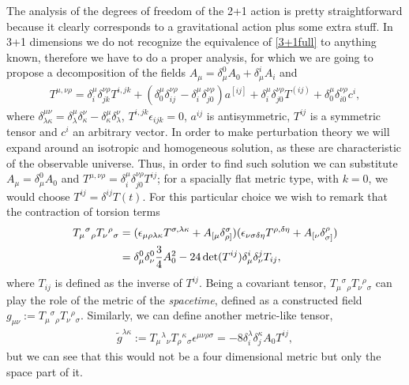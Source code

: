 \documentclass[%
  showpacs,showkeys,prd,superscriptaddress]{revtex4-1}
\begin{document}
The  analysis of the degrees of freedom of the 2+1 action is pretty straightforward because it clearly corresponds to a gravitational action plus some extra stuff. In 3+1 dimensions we do not recognize the equivalence of \eqref{3+1full} to anything known, therefore we have to do a proper analysis, for which we are going to propose a decomposition of the fields $A_\mu=\delta_\mu^0 A_0+\delta_\mu^iA_i$ and 
\begin{align}
  T^{\mu,\nu\rho}=\delta^{\mu}_i\delta^{\nu\rho}_{jk}T^{i,jk}+(\delta^{\mu}_0\delta^{\nu\rho}_{ij}-\delta^{\mu}_i\delta^{\nu\rho}_{j0})a^{[ij]}+\delta^{\mu}_i\delta^{\nu\rho}_{j0}T^{(ij)}+\delta^{\mu}_0\delta^{\nu\rho}_{i0}c^i,
\end{align}
where $\delta^{\mu\nu}_{\lambda\kappa}=\delta^{\mu}_{\lambda}\delta^{\nu}_{\kappa}-\delta^{\mu}_{\kappa}\delta^{\nu}_{\lambda}$, $T^{i,jk}\epsilon_{ijk}=0$, $a^{ij}$ is antisymmetric, $T^{ij}$ is a symmetric tensor and $c^i$ an arbitrary vector. In order to make perturbation theory we will expand around an isotropic and homogeneous solution, as these are characteristic of the observable universe. Thus, in order to find such solution we can substitute $A_\mu=\delta_\mu^0 A_0$ and $T^{\mu,\nu\rho}=\delta^{\mu}_i\delta^{\nu\rho}_{j0}T^{ij}$; for a spacially flat metric type, with $k=0$, we would choose $T^{ij}=\delta^{ij}T(t)$. For this particular choice we wish to remark that the contraction of torsion terms
\begin{align}
  T_{\mu}{}^{\sigma}{}_\rho T_{\nu}{}^{\rho}{}_\sigma &= (\epsilon_{\mu\rho\lambda\kappa}T^{\sigma,\lambda\kappa}+A_{[\mu}\delta^\sigma_{\rho]})(\epsilon_{\nu\sigma\delta\eta}T^{\rho,\delta\eta}+A_{[\nu}\delta^\rho_{\sigma]}) \notag \\
  &= \delta^0_\mu\delta^0_\nu\frac{3}{4} A_0^2-24\det(T^{ij})\delta^i_\mu\delta^j_\nu T_{ij},
\end{align}
where $T_{ij}$ is defined as the inverse of $T^{ij}$. Being a covariant tensor, $T_{\mu}{}^{\sigma}{}_\rho T_{\nu}{}^{\rho}{}_\sigma$ can play the role of the metric of the {\it spacetime}, defined as a constructed field $g_{\mu\nu}:= T_{\mu}{}^{\sigma}{}_\rho T_{\nu}{}^{\rho}{}_\sigma $. Similarly, we can define another metric-like tensor, 
\begin{align}
  \tilde g^{\lambda\kappa}:= T_{\mu}{}^{\lambda}{}_\nu T_{\rho}{}^{\kappa}{}_\sigma\epsilon^{\mu\nu\rho\sigma}=-8\delta^\lambda_i\delta^\kappa_jA_0T^{ij},
\end{align}
but we can see that this would not be a four dimensional metric but only the space part of it.
\end{document}
